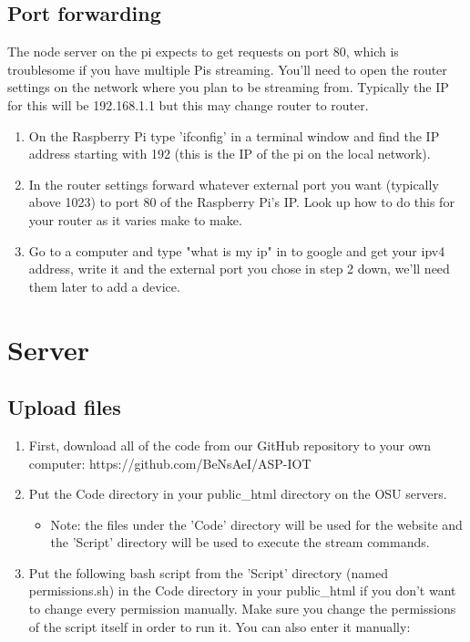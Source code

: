 \documentclass[onecolumn, draftclsnofoot,10pt, compsoc]{IEEEtran}
\begin{document}
\subsection{Port forwarding}
The node server on the pi expects to get requests on port 80, which is troublesome if you have multiple Pis streaming. You'll need to open the router settings on the network where you plan to be streaming from. Typically the IP for this will be 192.168.1.1 but this may change router to router.

\begin{enumerate}
    \item On the Raspberry Pi type 'ifconfig' in a terminal window and find the IP address starting with 192 (this is the IP of the pi on the local network).
    \item  In the router settings forward whatever external port you want (typically above 1023) to port 80 of the Raspberry Pi's IP. Look up how to do this for your router as it varies make to make.
    \item  Go to a computer and type "what is my ip" in to google and get your ipv4 address, write it and the external port you chose in step 2 down, we'll need them later to add a device.
\end{enumerate}


\section{Server}
\subsection{Upload files}
\begin{enumerate}
    \item First, download all of the code from our GitHub repository to your own computer: https://github.com/BeNsAeI/ASP-IOT
    
    \item Put the Code directory in your public\_html directory on the OSU servers.
    \begin{itemize}
        \item Note: the files under the 'Code' directory will be used for the website and the 'Script' directory will be used to execute the stream commands.
    \end{itemize}
    \item Put the following bash script from the 'Script' directory (named permissions.sh) in the Code directory in your public\_html if you don't want to change every permission manually. Make sure you change the permissions of the script itself in order to run it. You can also enter it manually:
\end{enumerate}
\end{document}
